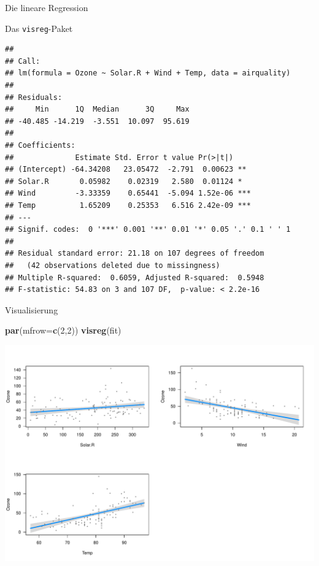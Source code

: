 \documentclass[ignorenonframetext,]{beamer}
\newenvironment{Shaded}{}{}
\newcommand{\KeywordTok}[1]{\textcolor[rgb]{0.00,0.44,0.13}{\textbf{{#1}}}}
\newcommand{\DataTypeTok}[1]{\textcolor[rgb]{0.56,0.13,0.00}{{#1}}}
\newcommand{\DecValTok}[1]{\textcolor[rgb]{0.25,0.63,0.44}{{#1}}}
\newcommand{\NormalTok}[1]{{#1}}
\begin{document}
\begin{frame}[fragile]{Die lineare Regression}
\begin{block}{Das \texttt{visreg}-Paket}
\begin{verbatim}
## 
## Call:
## lm(formula = Ozone ~ Solar.R + Wind + Temp, data = airquality)
## 
## Residuals:
##     Min      1Q  Median      3Q     Max 
## -40.485 -14.219  -3.551  10.097  95.619 
## 
## Coefficients:
##              Estimate Std. Error t value Pr(>|t|)    
## (Intercept) -64.34208   23.05472  -2.791  0.00623 ** 
## Solar.R       0.05982    0.02319   2.580  0.01124 *  
## Wind         -3.33359    0.65441  -5.094 1.52e-06 ***
## Temp          1.65209    0.25353   6.516 2.42e-09 ***
## ---
## Signif. codes:  0 '***' 0.001 '**' 0.01 '*' 0.05 '.' 0.1 ' ' 1
## 
## Residual standard error: 21.18 on 107 degrees of freedom
##   (42 observations deleted due to missingness)
## Multiple R-squared:  0.6059, Adjusted R-squared:  0.5948 
## F-statistic: 54.83 on 3 and 107 DF,  p-value: < 2.2e-16
\end{verbatim}

\end{block}

\begin{block}{Visualisierung}

\begin{Shaded}
\begin{Highlighting}[]
\KeywordTok{par}\NormalTok{(}\DataTypeTok{mfrow=}\KeywordTok{c}\NormalTok{(}\DecValTok{2}\NormalTok{,}\DecValTok{2}\NormalTok{))}
\KeywordTok{visreg}\NormalTok{(fit)}
\end{Highlighting}
\end{Shaded}

\includegraphics{R_intern_files/figure-beamer/unnamed-chunk-304-1.pdf}

\end{block}


\end{frame}
\end{document}
